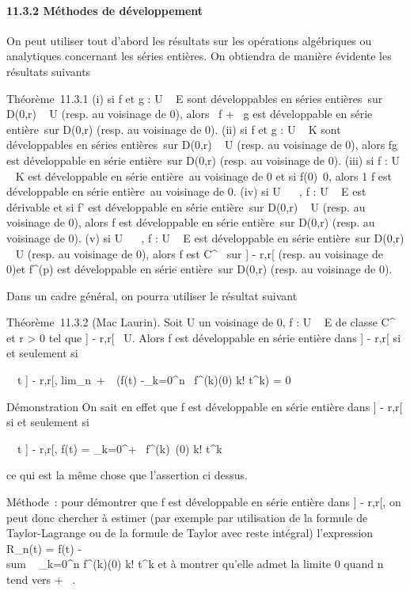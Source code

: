 \documentclass[]{article}
\begin{document}
\paragraph{11.3.2 Méthodes de développement}

On peut utiliser tout d'abord les résultats sur les opérations
algébriques ou analytiques concernant les séries entières. On obtiendra
de manière évidente les résultats suivants

Théorème~11.3.1 (i) si f et g : U \rightarrow~ E sont développables en séries
entières~sur D(0,r) \subset~ U (resp. au voisinage de 0), alors \alpha~f + \beta~g est
développable en série entière~sur D(0,r) (resp. au voisinage de 0). (ii)
si f et g : U \rightarrow~ K sont développables en séries entières~sur D(0,r) \subset~ U
(resp. au voisinage de 0), alors fg est développable en série
entière~sur D(0,r) (resp. au voisinage de 0). (iii) si f : U \rightarrow~ K est
développable en série entière~au voisinage de 0 et si
f(0)\neq~0, alors  1 \over f
est développable en série entière~au voisinage de 0. (iv) si U \subset~ ~, f :
U \rightarrow~ E est dérivable et si f' est développable en série entière~sur
D(0,r) \subset~ U (resp. au voisinage de 0), alors f est développable en série
entière~sur D(0,r) (resp. au voisinage de 0). (v) si U \subset~ ~, f : U \rightarrow~ E
est développable en série entière~sur D(0,r) \subset~ U (resp. au voisinage de
0), alors f est C^\infty~ sur ] - r,r[ (resp. au voisinage de
0)et f^(p) est développable en série entière~sur D(0,r)
(resp. au voisinage de 0).

Dans un cadre général, on pourra utiliser le résultat suivant

Théorème~11.3.2 (Mac Laurin). Soit U un voisinage de 0, f : U \rightarrow~ E de
classe C^\infty~ et r > 0 tel que ] - r,r[\subset~ U.
Alors f est développable en série entière dans ] - r,r[ si et
seulement si

\forall~~t \in] - r,r[,
lim_n\rightarrow~+\infty~~\left (f(t)
-\sum _k=0^n~
f^(k)(0) \over k!
t^k\right ) = 0

Démonstration On sait en effet que f est développable en série entière
dans ] - r,r[ si et seulement si

\forall~~t \in] - r,r[, f(t) =
\sum _k=0^+\infty~ f^(k)~(0)
\over k! t^k

ce qui est la même chose que l'assertion ci dessus.

Méthode~: pour démontrer que f est développable en série entière dans
] - r,r[, on peut donc chercher à estimer (par exemple par
utilisation de la formule de Taylor-Lagrange ou de la formule de Taylor
avec reste intégral) l'expression R_n(t) = f(t)
-\\sum ~
_k=0^n f^(k)(0) \over k!
t^k et à montrer qu'elle admet la limite 0 quand n tend vers
+ \infty~.
\end{document}
